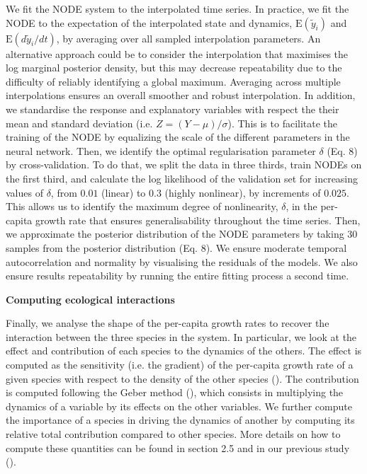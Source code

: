 \documentclass[11pt, oneside]{article}
\begin{document}
We fit the NODE system to the interpolated time series.
In practice, we fit the NODE to the expectation of the interpolated state and dynamics, $\mathrm{E}(\tilde{y}_i)$ and $\mathrm{E}(d\tilde{y}_i/dt)$, by averaging over all sampled interpolation parameters.
An alternative approach could be to consider the interpolation that maximises the log marginal posterior density, but this may decrease repeatability due to the difficulty of reliably identifying a global maximum.
Averaging across multiple interpolations ensures an overall smoother and robust interpolation. 
In addition, we standardise the response and explanatory variables with respect the their mean and standard deviation (i.e. $Z=(Y-\mu)/\sigma$).
This is to facilitate the training of the NODE by equalizing the scale of the different parameters in the neural network.
Then, we identify the optimal regularisation parameter $\delta$ (Eq. 8) by cross-validation.
To do that, we split the data in three thirds, train NODEs on the first third, and calculate the log likelihood of the validation set for increasing values of $\delta$, from $0.01$ (linear) to $0.3$ (highly nonlinear), by increments of $0.025$.
This allows us to identify the maximum degree of nonlinearity, $\delta$, in the per-capita growth rate that ensures generalisability throughout the time series.
Then, we approximate the posterior distribution of the NODE parameters by taking 30 samples from the posterior distribution (Eq. 8).
We ensure moderate temporal autocorrelation and normality by visualising the residuals of the models.
We also ensure results repeatability by running the entire fitting process a second time.

\textbf{Computing ecological interactions}

Finally, we analyse the shape of the per-capita growth rates to recover the interaction between the three species in the system.
In particular, we look at the effect and contribution of each species to the dynamics of the others.
The effect is computed as the sensitivity (i.e. the gradient) of the per-capita growth rate of a given species with respect to the density of the other species (\cite{Sugihara2012,Bonnaffe2021a}).
The contribution is computed following the Geber method (\cite{Hairston2005}), which consists in multiplying the dynamics of a variable by its effects on the other variables.
We further compute the importance of a species in driving the dynamics of another by computing its relative total contribution compared to other species.
More details on how to compute these quantities can be found in section 2.5 and in our previous study (\cite{Bonnaffe2021a}).
\end{document}
